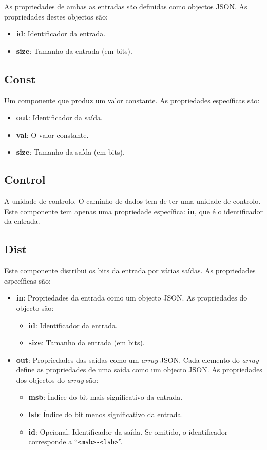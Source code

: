 \documentclass[11pt,a4paper,twoside,titlepage]{report}
\begin{document}
As propriedades de ambas as entradas são definidas como objectos JSON. As
propriedades destes objectos são:
\begin{itemize}
	\item \textbf{id}: Identificador da entrada.
	\item \textbf{size}: Tamanho da entrada (em bits).
\end{itemize}

\subsection{Const}

Um componente que produz um valor constante. As propriedades específicas são:
\begin{itemize}
	\item \textbf{out}: Identificador da saída.
	\item \textbf{val}: O valor constante.
	\item \textbf{size}: Tamanho da saída (em bits).
\end{itemize}

\subsection{Control}

A unidade de controlo. O caminho de dados tem de ter uma unidade de controlo.
Este componente tem apenas uma propriedade específica: \textbf{in}, que é o
identificador da entrada.

\subsection{Dist}

Este componente distribui os bits da entrada por várias saídas.
As propriedades específicas são:
\begin{itemize}
	\item \textbf{in}: Propriedades da entrada como um objecto JSON.
		As propriedades do objecto são:
		\begin{itemize}
			\item \textbf{id}: Identificador da entrada.
			\item \textbf{size}: Tamanho da entrada (em bits).
		\end{itemize}
	\item \textbf{out}: Propriedades das saídas como um \emph{array} JSON.
		Cada elemento do \emph{array} define as propriedades de uma saída como um
		objecto JSON. As propriedades dos objectos do \emph{array} são:
		\begin{itemize}
			\item \textbf{msb}: Índice do bit mais significativo da entrada.
			\item \textbf{lsb}: Índice do bit menos significativo da entrada.
			\item \textbf{id}: Opcional. Identificador da saída. Se omitido, o
				identificador corresponde a ``\verb+<msb>-<lsb>+''.
		\end{itemize}
\end{itemize}
\end{document}
